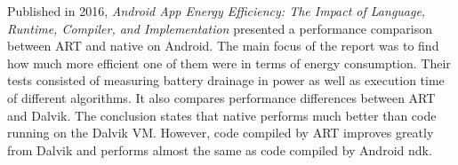 Published in 2016, \emph{Android App Energy Efficiency: The Impact of Language, Runtime, Compiler, and Implementation} \cite{Chen2016} presented a performance comparison between ART and native on Android. The main focus of the report was to find how much more efficient one of them were in terms of energy consumption. Their tests consisted of measuring battery drainage in power as well as execution time of different algorithms. It also compares performance differences between ART and Dalvik. The conclusion states that native performs much better than code running on the Dalvik VM. However, code compiled by ART improves greatly from Dalvik and performs almost the same as code compiled by Android \gls{ndk}.

